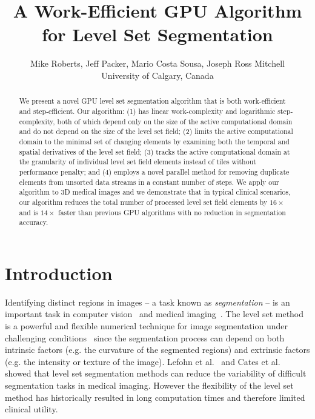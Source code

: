 \documentclass{egpubl}
\title[A Work-Efficient GPU Algorithm for Level Set Segmentation]%
      {A Work-Efficient GPU Algorithm for Level Set Segmentation}
\author[Roberts, Packer, Sousa, Mitchell]
       {Mike Roberts, Jeff Packer, Mario Costa Sousa, Joseph Ross Mitchell
        \\
        University of Calgary, Canada
       }
\begin{document}
\maketitle

\begin{abstract}

We present a novel GPU level set segmentation algorithm that is both work-efficient and step-efficient. Our algorithm: (1) has linear work-complexity and logarithmic step-complexity, both of which depend only on the size of the active computational domain and do not depend on the size of the level set field; (2) limits the active computational domain to the minimal set of changing elements by examining both the temporal and spatial derivatives of the level set field; (3) tracks the active computational domain at the granularity of individual level set field elements instead of tiles without performance penalty; and (4) employs a novel parallel method for removing duplicate elements from unsorted data streams in a constant number of steps. We apply our algorithm to 3D medical images and we demonstrate that in typical clinical scenarios, our algorithm reduces the total number of processed level set field elements by $16 \times$ and is $14 \times$ faster than previous GPU algorithms with no reduction in segmentation accuracy.

\end{abstract}


\section{Introduction}
\label{sec:introduction}

Identifying distinct regions in images -- a task known as \emph{segmentation} -- is an important task in computer vision~\cite{Osher-2003} and medical imaging~\cite{Shattuck-2009}. The level set method is a powerful and flexible numerical technique for image segmentation under challenging conditions~\cite{Whitaker-1994} since the segmentation process can depend on both intrinsic factors (e.g. the curvature of the segmented regions) and extrinsic factors (e.g. the intensity or texture of the image). Lefohn et al.~\cite{Lefohn-2003-MICCAI} and Cates et al.~\cite{Cates-2004} showed that level set segmentation methods can reduce the variability of difficult segmentation tasks in medical imaging. However the flexibility of the level set method has historically resulted in long computation times and therefore limited clinical utility.
\end{document}
